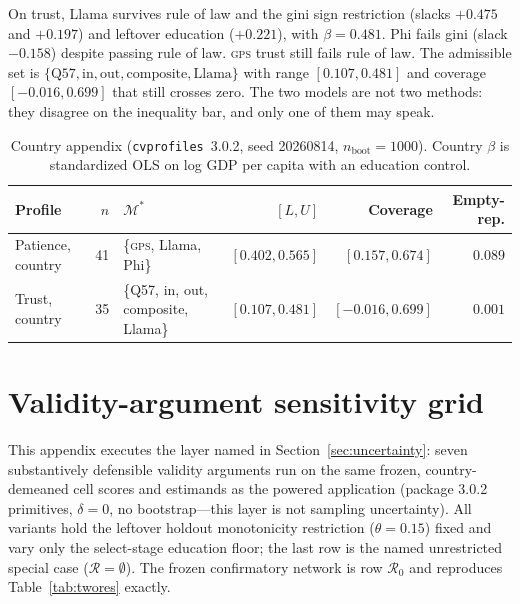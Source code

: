 \documentclass[10pt,letterpaper]{article}
\newcommand{\GPS}{\textsc{gps}}
\newcommand{\cvp}{\texttt{cvprofiles}}
\newcommand{\M}{\ensuremath{\mathcal{M}}}
\newcommand{\Rset}{\mathcal{R}}
\begin{document}
On trust, Llama survives rule of law and the gini sign restriction (slacks $+0.475$ and $+0.197$) and leftover education ($+0.221$), with $\beta=0.481$.
Phi fails gini (slack $-0.158$) despite passing rule of law.
\GPS{} trust still fails rule of law.
The admissible set is $\{\mathrm{Q57},\mathrm{in},\mathrm{out},\mathrm{composite},\mathrm{Llama}\}$ with range $[0.107,0.481]$ and coverage $[-0.016,0.699]$ that still crosses zero.
The two models are not two methods: they disagree on the inequality bar, and only one of them may speak.

\begin{table}[ht]
\centering
\small
\caption{Country appendix (\cvp{}~3.0.2, seed 20260814, $n_{\mathrm{boot}}=1000$).
Country $\beta$ is standardized OLS on log GDP per capita with an education control.}
\label{tab:country_llm}
\begin{tabularx}{\textwidth}{@{}>{\raggedright\arraybackslash}p{2.8cm} r >{\raggedright\arraybackslash}p{4.2cm} r r r@{}}
\toprule
\textbf{Profile} & $n$ & $\M^*$ & $[L,U]$ & \textbf{Coverage} & \textbf{Empty-rep.} \\
\midrule
Patience, country & 41 & \{\GPS{}, Llama, Phi\} & $[0.402,0.565]$ & $[0.157,0.674]$ & $0.089$ \\
Trust, country & 35 & \{Q57, in, out, composite, Llama\} & $[0.107,0.481]$ & $[-0.016,0.699]$ & $0.001$ \\
\bottomrule
\end{tabularx}
\end{table}

\section{Validity-argument sensitivity grid}
\label{app:netsens}

This appendix executes the layer named in Section~\ref{sec:uncertainty}: seven substantively defensible validity arguments run on the same frozen, country-demeaned cell scores and estimands as the powered application (package 3.0.2 primitives, $\delta=0$, no bootstrap---this layer is not sampling uncertainty).
All variants hold the leftover holdout monotonicity restriction ($\theta=0.15$) fixed and vary only the select-stage education floor; the last row is the named unrestricted special case ($\Rset=\emptyset$).
The frozen confirmatory network is row $\Rset_0$ and reproduces Table~\ref{tab:twores} exactly.
\end{document}

